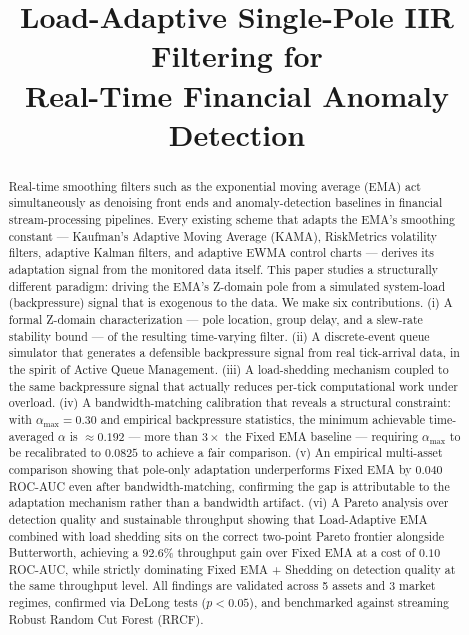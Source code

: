 \documentclass[conference]{IEEEtran}
\begin{document}
\title{Load-Adaptive Single-Pole IIR Filtering for\\
Real-Time Financial Anomaly Detection}

\author{
}

\maketitle

\begin{abstract}
Real-time smoothing filters such as the exponential moving average (EMA)
act simultaneously as denoising front ends and anomaly-detection baselines in
financial stream-processing pipelines. Every existing scheme that adapts the
EMA's smoothing constant — Kaufman's Adaptive Moving Average (KAMA),
RiskMetrics volatility filters, adaptive Kalman filters, and adaptive EWMA
control charts — derives its adaptation signal from the monitored data itself.
This paper studies a structurally different paradigm: driving the EMA's
Z-domain pole from a simulated system-load (backpressure) signal that is
exogenous to the data. We make six contributions.
(i) A formal Z-domain characterization — pole location, group delay, and a
slew-rate stability bound — of the resulting time-varying filter.
(ii) A discrete-event queue simulator that generates a defensible backpressure
signal from real tick-arrival data, in the spirit of Active Queue Management.
(iii) A load-shedding mechanism coupled to the same backpressure signal that
actually reduces per-tick computational work under overload.
(iv) A bandwidth-matching calibration that reveals a structural constraint:
with \(\alpha_\text{max}=0.30\) and empirical backpressure statistics, the
minimum achievable time-averaged \(\alpha\) is $\approx 0.192$ — more than
$3\times$ the Fixed EMA baseline — requiring \(\alpha_\text{max}\) to be
recalibrated to $0.0825$ to achieve a fair comparison.
(v) An empirical multi-asset comparison showing that pole-only
adaptation underperforms Fixed EMA by $0.040$ ROC-AUC even after
bandwidth-matching, confirming the gap is attributable to the adaptation
mechanism rather than a bandwidth artifact.
(vi) A Pareto analysis over detection quality and sustainable throughput
showing that Load-Adaptive EMA combined with load shedding sits on the
correct two-point Pareto frontier alongside Butterworth, achieving a
$92.6\%$ throughput gain over Fixed EMA at a cost of $0.10$ ROC-AUC,
while strictly dominating Fixed EMA + Shedding on detection quality at the
same throughput level. All findings are validated across 5 assets and 3 market regimes, confirmed via DeLong tests ($p < 0.05$), and benchmarked against streaming Robust Random Cut Forest (RRCF).
\end{abstract}
\end{document}
